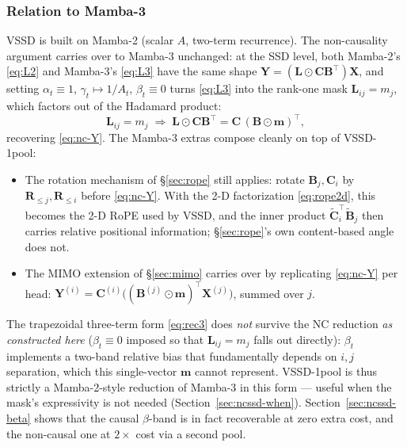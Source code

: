 \documentclass[11pt,a4paper]{article}
\begin{document}
\subsubsection{Relation to Mamba-3}\label{sec:ncssd-mamba3}

VSSD is built on Mamba-2 (scalar $A$, two-term recurrence). The
non-causality argument carries over to Mamba-3 unchanged: at the SSD
level, both Mamba-2's \eqref{eq:L2} and Mamba-3's \eqref{eq:L3} have
the same shape $\bm{Y} = (\bm{L}\odot\bm{C}\bm{B}^\top)\bm{X}$, and
setting $\alpha_t \equiv 1$, $\gamma_t \mapsto 1/A_t$, $\beta_t \equiv 0$
turns \eqref{eq:L3} into the rank-one mask $\bm{L}_{ij} = m_j$, which
factors out of the Hadamard product:
\begin{equation}
  \bm{L}_{ij} = m_j
  \;\Longrightarrow\;
  \bm{L}\odot\bm{C}\bm{B}^\top
     = \bm{C}\,(\bm{B}\odot\bm{m})^\top,
\end{equation}
recovering \eqref{eq:nc-Y}. The Mamba-3 extras compose cleanly on top
of VSSD-1pool:
\begin{itemize}
  \item The rotation mechanism of \S\ref{sec:rope} still applies: rotate
        $\bm{B}_j, \bm{C}_i$ by $\bm{R}_{\le j}, \bm{R}_{\le i}$ before
        \eqref{eq:nc-Y}. With the 2-D factorization \eqref{eq:rope2d}, this
        becomes the 2-D RoPE used by VSSD, and the inner product
        $\widetilde{\bm{C}}_i^\top \widetilde{\bm{B}}_j$ then carries relative
        positional information; \S\ref{sec:rope}'s own content-based angle
        does not.
  \item The MIMO extension of \S\ref{sec:mimo} carries over by
        replicating \eqref{eq:nc-Y} per head: $\bm{Y}^{(i)} =
        \bm{C}^{(i)}\bigl((\bm{B}^{(j)}\odot\bm{m})^\top\bm{X}^{(j)}\bigr)$,
        summed over $j$.
\end{itemize}
The trapezoidal three-term form \eqref{eq:rec3} does \emph{not}
survive the NC reduction \emph{as constructed here}
($\beta_t\equiv0$ imposed so that $\bm{L}_{ij}=m_j$ falls out
directly): $\beta_t$ implements a two-band relative bias that
fundamentally depends on $i,j$ separation, which this single-vector
$\bm{m}$ cannot represent. VSSD-1pool is thus strictly a
Mamba-2-style reduction of Mamba-3 in this form — useful when the
mask's expressivity is not needed (Section~\ref{sec:ncssd-when}).
Section~\ref{sec:ncssd-beta} shows that the causal $\beta$-band is in
fact recoverable at zero extra cost, and the non-causal one at
$2\times$ cost via a second pool.
\end{document}
